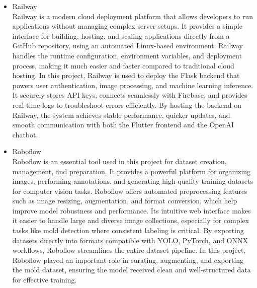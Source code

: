 \documentclass[conference]{IEEEtran}
\begin{document}
\begin{itemize}
        \item Railway \\
        Railway is a modern cloud deployment platform that allows developers to run applications without managing complex server setups. It provides a simple interface for building, hosting, and scaling applications directly from a GitHub repository, using an automated Linux-based environment. Railway handles the runtime configuration, environment variables, and deployment process, making it much easier and faster compared to traditional cloud hosting. In this project, Railway is used to deploy the Flask backend that powers user authentication, image processing, and machine learning inference. It securely stores API keys, connects seamlessly with Firebase, and provides real-time logs to troubleshoot errors efficiently. By hosting the backend on Railway, the system achieves stable performance, quicker updates, and smooth communication with both the Flutter frontend and the OpenAI chatbot. \\

        \item Roboflow \\
        Roboflow is an essential tool used in this project for dataset creation, management, and preparation. It provides a powerful platform for organizing images, performing annotations, and generating high-quality training datasets for computer vision tasks. Roboflow offers automated preprocessing features such as image resizing, augmentation, and format conversion, which help improve model robustness and performance. Its intuitive web interface makes it easier to handle large and diverse image collections, especially for complex tasks like mold detection where consistent labeling is critical. By exporting datasets directly into formats compatible with YOLO, PyTorch, and ONNX workflows, Roboflow streamlines the entire dataset pipeline. In this project, Roboflow played an important role in curating, augmenting, and exporting the mold dataset, ensuring the model received clean and well-structured data for effective training.\\
        
    \end{itemize}
\end{document}
